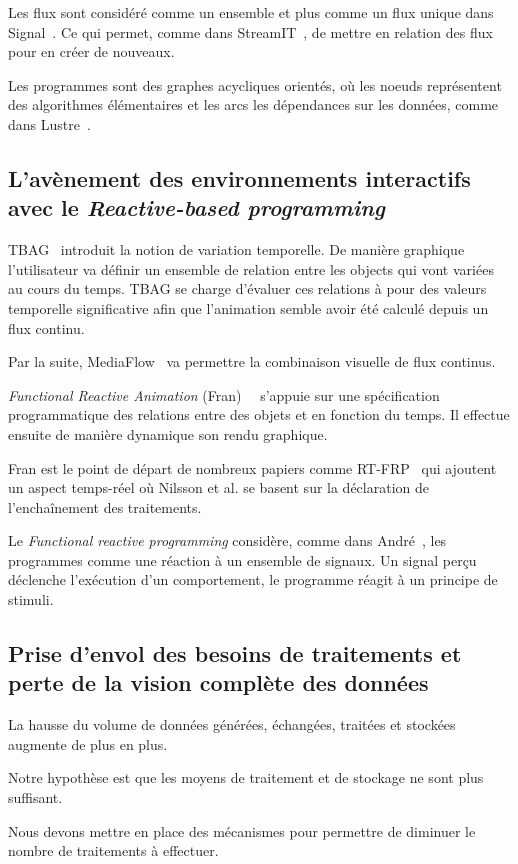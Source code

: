 \documentclass{llncs}
\newcommand{\RP}{\emph{Reactive-based programming} }
\newcommand{\FRP}{\emph{Functional reactive programming} }
\begin{document}
Les flux sont considéré comme un ensemble et plus comme un flux unique dans Signal~\cite{Benveniste85}.
Ce qui permet, comme dans StreamIT~\cite{Thies02}, de mettre en relation des flux
pour en créer de nouveaux.

Les programmes sont des graphes acycliques orientés, où les noeuds représentent des
algorithmes élémentaires et les arcs les dépendances sur les données, comme dans
Lustre~\cite{Caspi87}.

\subsection{L'avènement des environnements interactifs avec le \RP}
TBAG~\cite{Elliott94} introduit la notion de variation temporelle.
De manière graphique l'utilisateur va définir un ensemble de relation
entre les objects qui vont variées au cours du temps.
TBAG se charge d'évaluer ces relations à pour des valeurs temporelle
significative afin que l'animation semble avoir été calculé depuis
un flux continu.

Par la suite, MediaFlow~\cite{Elliott95} va permettre la combinaison visuelle
de flux continus.

\emph{Functional Reactive Animation} (Fran)~\cite{Elliott97}~\cite{Elliott98}
s'appuie sur une spécification programmatique des relations entre des objets
et en fonction du temps.
Il effectue ensuite de manière dynamique son rendu graphique.

Fran est le point de départ de nombreux papiers comme RT-FRP~\cite{Wan02}
qui ajoutent un aspect temps-réel où Nilsson et al.\cite{Nilsson2002a} se basent
sur la déclaration de l'enchaînement des traitements.

Le \FRP considère, comme dans André~\cite{Andre96}, les programmes comme
une réaction à un ensemble de signaux. Un signal perçu déclenche l'exécution
d'un comportement, le programme réagit à un principe de stimuli.

\subsection{Prise d'envol des besoins de traitements et perte de la vision complète des données}
La hausse du volume de données générées, échangées, traitées et stockées augmente de
plus en plus.

Notre hypothèse est que les moyens de traitement et de stockage ne sont plus
suffisant.

Nous devons mettre en place des mécanismes pour permettre de diminuer le nombre
de traitements à effectuer.
\end{document}
